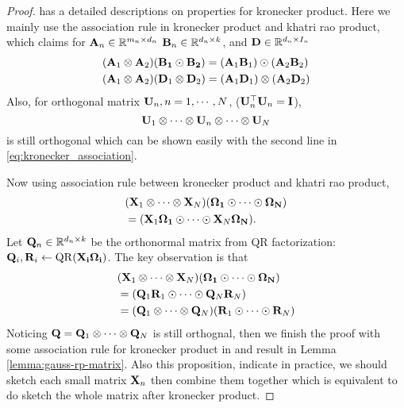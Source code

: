 \begin{proof}
\citep{schacke2013kronecker} has a detailed descriptions on properties for kronecker product. Here we mainly use the association rule in kronecker product and khatri rao product, which claims for $\mathbf{A}_n \in \mathbb{R}^{m_n\times d_n}$ 
$\mathbf{B}_n \in \mathbb{R}^{d_n\times k}$, and $\mathbf{D}\in \mathbb{R}^{d_n\times I_n}$
\begin{equation}
\label{eq:kronecker_association}
\begin{aligned}
& (\mathbf{A}_1\otimes  \mathbf{A}_2)(\mathbf{B_1} \odot  \mathbf{B_2}) = (\mathbf{A}_1\mathbf{B}_1)\odot   (\mathbf{A}_2\mathbf{B}_2)\\
& (\mathbf{A}_1\otimes  \mathbf{A}_2)(\mathbf{D}_1 \otimes  \mathbf{D}_2) = (\mathbf{A}_1\mathbf{D}_1)\otimes  (\mathbf{A}_2\mathbf{D}_2)
\end{aligned}
\end{equation}
Also, for orthogonal matrix $\mathbf{U}_n, n = 1, \cdots, N$, ($\mathbf{U}^\top_n \mathbf{U}_n = \mathbf{I}$),  
\[
\mathbf{U}_1 \otimes \cdots \otimes \mathbf{U}_n \otimes \cdots \otimes \mathbf{U}_N
\]
is still orthogonal which can be shown easily with the second line in \eqref{eq:kronecker_association}. \par 
Now using association rule between kronecker product and khatri rao product,   
\begin{equation}
\begin{aligned}
& (\mathbf{X}_1\otimes \cdots \otimes \mathbf{X}_N)(\mathbf{\Omega_1} \odot \cdots \odot \mathbf{\Omega_N})  \\
& = ( \mathbf{X}_1\mathbf{\Omega_1}\odot \cdots \odot  \mathbf{X}_N\mathbf{\Omega_N}). 
\end{aligned}
\end{equation}
 Let $\mathbf{Q}_n\in \mathbb{R}^{d_n\times k}$ be the orthonormal matrix from QR factorization: $\mathbf{Q}_i, \mathbf{R}_i \gets  \rm{QR}(\mathbf{X_i\Omega_i})$. The key observation is that 
\begin{equation}
\begin{aligned}
& (\mathbf{X}_1\otimes \cdots \otimes \mathbf{X}_N)(\mathbf{\Omega_1} \odot \cdots \odot \mathbf{\Omega_N})  \\
& = ( \mathbf{Q}_1\mathbf{R}_1 \odot \cdots \odot  \mathbf{Q}_N\mathbf{R}_N)\\
& = (\mathbf{Q}_1 \otimes \cdots \otimes \mathbf{Q}_N) (\mathbf{R}_1\odot \cdots \odot \mathbf{R}_N) 
\end{aligned}
\end{equation}
Noticing $\mathbf{Q} = \mathbf{Q}_1\otimes \cdots \otimes \mathbf{Q}_N$ is still orthognal,  then we finish the proof with some association rule for kronecker product in \cite{schacke2013kronecker} and result in Lemma \ref{lemma:gauss-rp-matrix}.  Also this proposition, indicate in practice, we should sketch each small matrix $\mathbf{X}_n$ then combine them together which is equivalent to do sketch the whole matrix after kronecker product. 
 
\end{proof}





